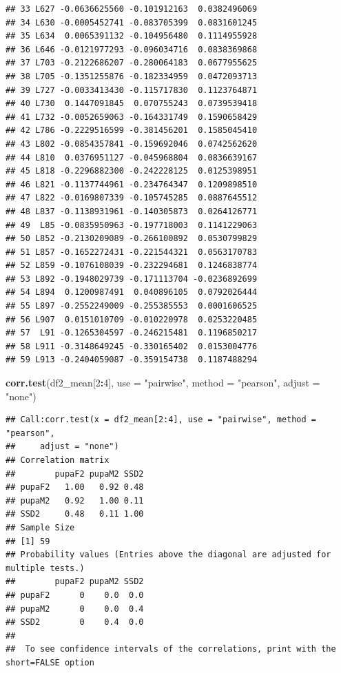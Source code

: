 \documentclass[
]{article}
\newenvironment{Shaded}{\begin{snugshade}}{\end{snugshade}}
\newcommand{\DataTypeTok}[1]{\textcolor[rgb]{0.13,0.29,0.53}{#1}}
\newcommand{\DecValTok}[1]{\textcolor[rgb]{0.00,0.00,0.81}{#1}}
\newcommand{\KeywordTok}[1]{\textcolor[rgb]{0.13,0.29,0.53}{\textbf{#1}}}
\newcommand{\NormalTok}[1]{#1}
\newcommand{\OperatorTok}[1]{\textcolor[rgb]{0.81,0.36,0.00}{\textbf{#1}}}
\newcommand{\StringTok}[1]{\textcolor[rgb]{0.31,0.60,0.02}{#1}}
\begin{document}
\begin{verbatim}
## 33 L627 -0.0636625560 -0.101912163  0.0382496069
## 34 L630 -0.0005452741 -0.083705399  0.0831601245
## 35 L634  0.0065391132 -0.104956480  0.1114955928
## 36 L646 -0.0121977293 -0.096034716  0.0838369868
## 37 L703 -0.2122686207 -0.280064183  0.0677955625
## 38 L705 -0.1351255876 -0.182334959  0.0472093713
## 39 L727 -0.0033413430 -0.115717830  0.1123764871
## 40 L730  0.1447091845  0.070755243  0.0739539418
## 41 L732 -0.0052659063 -0.164331749  0.1590658429
## 42 L786 -0.2229516599 -0.381456201  0.1585045410
## 43 L802 -0.0854357841 -0.159692046  0.0742562620
## 44 L810  0.0376951127 -0.045968804  0.0836639167
## 45 L818 -0.2296882300 -0.242228125  0.0125398951
## 46 L821 -0.1137744961 -0.234764347  0.1209898510
## 47 L822 -0.0169807339 -0.105745285  0.0887645512
## 48 L837 -0.1138931961 -0.140305873  0.0264126771
## 49  L85 -0.0835950963 -0.197718003  0.1141229063
## 50 L852 -0.2130209089 -0.266100892  0.0530799829
## 51 L857 -0.1652272431 -0.221544321  0.0563170783
## 52 L859 -0.1076108039 -0.232294681  0.1246838774
## 53 L892 -0.1948029739 -0.171113704 -0.0236892699
## 54 L894  0.1200987491  0.040896105  0.0792026444
## 55 L897 -0.2552249009 -0.255385553  0.0001606525
## 56 L907  0.0151010709 -0.010220978  0.0253220485
## 57  L91 -0.1265304597 -0.246215481  0.1196850217
## 58 L911 -0.3148649245 -0.330165402  0.0153004776
## 59 L913 -0.2404059087 -0.359154738  0.1187488294
\end{verbatim}

\begin{Shaded}
\begin{Highlighting}[]
\KeywordTok{corr.test}\NormalTok{(df2_mean[}\DecValTok{2}\OperatorTok{:}\DecValTok{4}\NormalTok{],}
          \DataTypeTok{use    =} \StringTok{"pairwise"}\NormalTok{,}
          \DataTypeTok{method =} \StringTok{"pearson"}\NormalTok{,}
          \DataTypeTok{adjust =} \StringTok{"none"}\NormalTok{)}
\end{Highlighting}
\end{Shaded}

\begin{verbatim}
## Call:corr.test(x = df2_mean[2:4], use = "pairwise", method = "pearson", 
##     adjust = "none")
## Correlation matrix 
##        pupaF2 pupaM2 SSD2
## pupaF2   1.00   0.92 0.48
## pupaM2   0.92   1.00 0.11
## SSD2     0.48   0.11 1.00
## Sample Size 
## [1] 59
## Probability values (Entries above the diagonal are adjusted for multiple tests.) 
##        pupaF2 pupaM2 SSD2
## pupaF2      0    0.0  0.0
## pupaM2      0    0.0  0.4
## SSD2        0    0.4  0.0
## 
##  To see confidence intervals of the correlations, print with the short=FALSE option
\end{verbatim}
\end{document}
